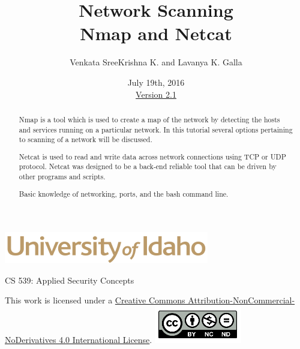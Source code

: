 \documentclass[12pt]{extarticle}
\begin{document}
\title{ Network Scanning \\ \large Nmap and Netcat}
\author{Venkata SreeKrishna K. and Lavanya K. Galla}
\date{July 19th, 2016 \\ \hyperref[changelog]{Version 2.1}} %
\renewcommand{\abstractname}{Executive Summary}
\begin{titlepage}
\maketitle
\keepthetitle %
\begin{center}
\includegraphics[scale=.5]{UofI}

\large{CS 539: Applied Security Concepts}

\vskip 40pt

\end{center}
\begin{abstract}
Nmap is a tool which is used to create a map of the network by detecting the hosts and services running on a particular network. In this tutorial several options pertaining to scanning of a network will be discussed.

Netcat is used to read and write data across network connections using TCP or UDP protocol. Netcat was designed to be a back-end reliable tool that can be driven by other programs and scripts.


Basic knowledge of networking, ports, and the bash command line.
\end{abstract}


\vfill
\begin{center}
This work is licensed under a \href{http://creativecommons.org/licenses/by/4.0/}{Creative Commons Attribution-NonCommercial-NoDerivatives 4.0 International License}.
\vskip 10pt
\includegraphics[scale=.5]{cc}
\end{center}

\end{titlepage}

\end{document}
